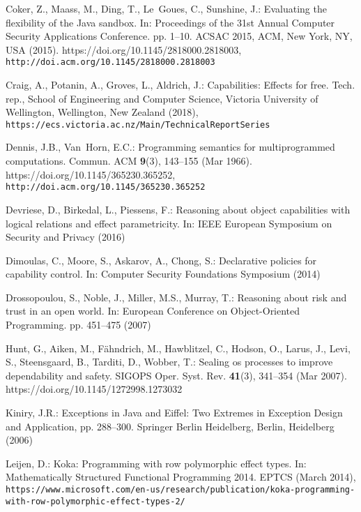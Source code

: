 \documentclass[runningheads]{llncs}
\begin{document}
\begin{thebibliography}{10}
\vspace{-0.2cm}
\providecommand{\url}[1]{\texttt{#1}}
\providecommand{\urlprefix}{URL }
\providecommand{\doi}[1]{https://doi.org/#1}

Coker, Z., Maass, M., Ding, T., Le~Goues, C., Sunshine, J.: Evaluating the
  flexibility of the {J}ava sandbox. In: Proceedings of the 31st Annual
  Computer Security Applications Conference. pp. 1--10. ACSAC 2015, ACM, New
  York, NY, USA (2015). \doi{10.1145/2818000.2818003},
  \url{http://doi.acm.org/10.1145/2818000.2818003}

Craig, A., Potanin, A., Groves, L., Aldrich, J.: Capabilities: Effects for
  free. Tech. rep., School of Engineering and Computer Science, Victoria
  University of Wellington, Wellington, New Zealand (2018),
  \url{https://ecs.victoria.ac.nz/Main/TechnicalReportSeries}

Dennis, J.B., Van~Horn, E.C.: Programming semantics for multiprogrammed
  computations. Commun. ACM  \textbf{9}(3),  143--155 (Mar 1966).
  \doi{10.1145/365230.365252}, \url{http://doi.acm.org/10.1145/365230.365252}

Devriese, D., Birkedal, L., Piessens, F.: Reasoning about object capabilities
  with logical relations and effect parametricity. In: IEEE European Symposium
  on Security and Privacy (2016)

Dimoulas, C., Moore, S., Askarov, A., Chong, S.: Declarative policies for
  capability control. In: Computer Security Foundations Symposium (2014)

Drossopoulou, S., Noble, J., Miller, M.S., Murray, T.: Reasoning about risk and
  trust in an open world. In: European Conference on Object-Oriented
  Programming. pp. 451--475 (2007)

Hunt, G., Aiken, M., F\"{a}hndrich, M., Hawblitzel, C., Hodson, O., Larus, J.,
  Levi, S., Steensgaard, B., Tarditi, D., Wobber, T.: Sealing os processes to
  improve dependability and safety. SIGOPS Oper. Syst. Rev.  \textbf{41}(3),
  341--354 (Mar 2007). \doi{10.1145/1272998.1273032}

Kiniry, J.R.: Exceptions in Java and Eiffel: Two Extremes in Exception Design
  and Application, pp. 288--300. Springer Berlin Heidelberg, Berlin, Heidelberg
  (2006)

Leijen, D.: Koka: Programming with row polymorphic effect types. In:
  Mathematically Structured Functional Programming 2014. EPTCS (March 2014),
  \url{https://www.microsoft.com/en-us/research/publication/koka-programming-with-row-polymorphic-effect-types-2/}


\end{thebibliography}
\end{document}
